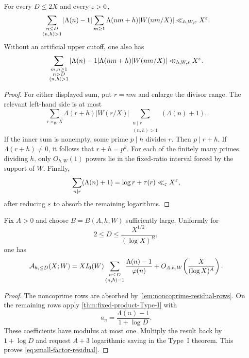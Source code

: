 \begin{lemma}
\label{lem:noncoprime-residual-rows}
For every $D\leq2X$ and every $\varepsilon>0$,
\begin{equation}\label{eq:noncoprime-residual-rows}
 \sum_{\substack{n\leq D\\(n,h)>1}}
 |\Lambda(n)-1|
 \sum_{m\geq1}\Lambda(nm+h)|W(nm/X)|
 \ll_{h,W,\varepsilon}X^\varepsilon.
\end{equation}
Without an artificial upper cutoff, one also has
\begin{equation}\label{eq:noncoprime-residual-tail}
 \sum_{\substack{m,n\geq1\\n>D\\(n,h)>1}}
 |\Lambda(n)-1|\Lambda(nm+h)|W(nm/X)|
 \ll_{h,W,\varepsilon}X^\varepsilon.
\end{equation}
\end{lemma}

\begin{proof}
For either displayed sum, put $r=nm$ and enlarge the divisor range.  The
relevant left-hand side is at most
\[
 \sum_{r\asymp_W X}\Lambda(r+h)|W(r/X)|
 \sum_{\substack{n\mid r\\(n,h)>1}}(\Lambda(n)+1).
\]
If the inner sum is nonempty, some prime $p\mid h$ divides $r$.  Then
$p\mid r+h$.  If $\Lambda(r+h)\ne0$, it follows that $r+h=p^k$.
For each of the finitely many primes dividing $h$, only $O_{h,W}(1)$ powers
lie in the fixed-ratio interval forced by the support of $W$.  Finally,
\[
 \sum_{n\mid r}(\Lambda(n)+1)=\log r+\tau(r)\ll_\varepsilon X^\varepsilon,
\]
after reducing $\varepsilon$ to absorb the remaining logarithms.
\end{proof}

\begin{theorem}
\label{thm:small-factor-residual}
Fix $A>0$ and choose $B=B(A,h,W)$ sufficiently large.  Uniformly for
\begin{equation}\label{eq:small-factor-D-range}
 2\leq D\leq\frac{X^{1/2}}{(\log X)^B},
\end{equation}
one has
\begin{equation}\label{eq:small-factor-residual}
 \mathcal A_{h,\leq D}(X;W)
 =XI_0(W)
  \sum_{\substack{n\leq D\\(n,h)=1}}
  \frac{\Lambda(n)-1}{\varphi(n)}
 +O_{A,h,W}\!\left(\frac{X}{(\log X)^A}\right).
\end{equation}
\end{theorem}

\begin{proof}
The noncoprime rows are absorbed by
\cref{lem:noncoprime-residual-rows}.  On the remaining rows apply
\cref{thm:fixed-product-Type-I} with
\[
 a_n=\frac{\Lambda(n)-1}{1+\log D}.
\]
These coefficients have modulus at most one.  Multiply the result back by
$1+\log D$ and request $A+3$ logarithmic saving in the Type~I theorem.
This proves \eqref{eq:small-factor-residual}.
\end{proof}

